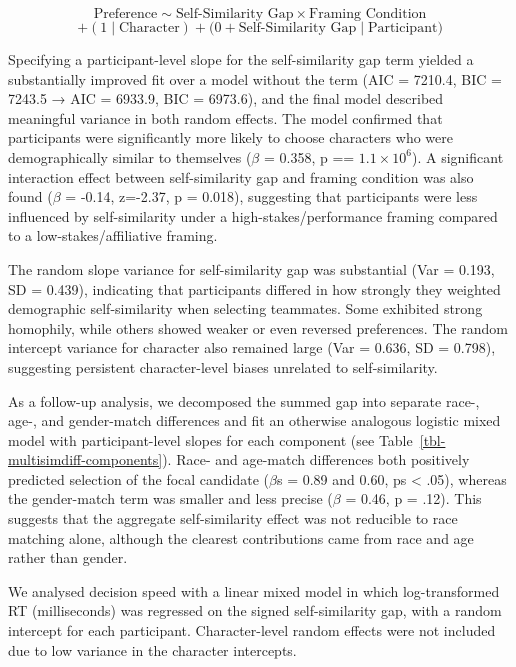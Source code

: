 \documentclass[
  man,
  floatsintext,
  longtable,
  nolmodern,
  notxfonts,
  notimes,
  draftfirst,
  colorlinks=true,linkcolor=blue,citecolor=blue,urlcolor=blue]{apa7}
\begin{document}
\label{eq-mixed-effects}
\[
\text{Preference} \sim \text{Self-Similarity Gap} \times \text{Framing Condition}
\] \[
+ (1 \mid \text{Character}) +\bigl(0 + \text{Self-Similarity Gap} \mid \text{Participant}\bigr)
\]

Specifying a participant-level slope for the self-similarity gap term
yielded a substantially improved fit over a model without the term (AIC
= 7210.4, BIC = 7243.5 → AIC = 6933.9, BIC = 6973.6), and the final
model described meaningful variance in both random effects. The model
confirmed that participants were significantly more likely to choose
characters who were demographically similar to themselves (\(\beta\) =
0.358, p == \(1.1 \times 10^{6}\)). A significant interaction effect
between self-similarity gap and framing condition was also found
(\(\beta\) = -0.14, z=-2.37, p = 0.018), suggesting that participants
were less influenced by self-similarity under a high-stakes/performance
framing compared to a low-stakes/affiliative framing.

The random slope variance for self-similarity gap was substantial (Var =
0.193, SD = 0.439), indicating that participants differed in how
strongly they weighted demographic self-similarity when selecting
teammates. Some exhibited strong homophily, while others showed weaker
or even reversed preferences. The random intercept variance for
character also remained large (Var = 0.636, SD = 0.798), suggesting
persistent character-level biases unrelated to self-similarity.

As a follow-up analysis, we decomposed the summed gap into separate
race-, age-, and gender-match differences and fit an otherwise analogous
logistic mixed model with participant-level slopes for each component
(see Table~\ref{tbl-multisimdiff-components}). Race- and age-match
differences both positively predicted selection of the focal candidate
(\(\beta\)s = 0.89 and 0.60, ps \textless{} .05), whereas the
gender-match term was smaller and less precise (\(\beta\) = 0.46, p =
.12). This suggests that the aggregate self-similarity effect was not
reducible to race matching alone, although the clearest contributions
came from race and age rather than gender.

We analysed decision speed with a linear mixed model in which
log-transformed RT (milliseconds) was regressed on the signed
self-similarity gap, with a random intercept for each participant.
Character-level random effects were not included due to low variance in
the character intercepts.
\end{document}

